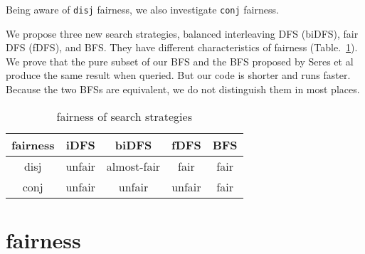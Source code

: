 \documentclass[format=acmlarge, review=true, authordraft=true]{acmart}
\newcommand{\conde}{\texttt{cond$^e$} }
\begin{document}
Being aware of \texttt{disj} fairness, we also investigate \texttt{conj} 
fairness. 

We propose three new search strategies, balanced interleaving DFS (biDFS), fair 
DFS (fDFS), and BFS. They have different characteristics of fairness 
(Table.~\ref{fairness}). We prove that the pure subset of our BFS and the BFS 
proposed by Seres et
al~\citep{seres1999algebra} produce the same result when queried. But our code 
is shorter and runs faster. Because the two BFSs are equivalent, we do not 
distinguish them in most places.
 
\begin{table}
	\begin{tabular}{|c|c|c|c|c|}
		\hline 
		fairness & iDFS & biDFS & fDFS & BFS \\ 
		\hline 
		disj & unfair & almost-fair & fair & fair \\ 
		\hline 
		conj & unfair & unfair & unfair & fair \\ 
		\hline 
	\end{tabular} 
	\caption{fairness of search strategies}
	\label{fairness}
\end{table}


\section{fairness}
\end{document}

